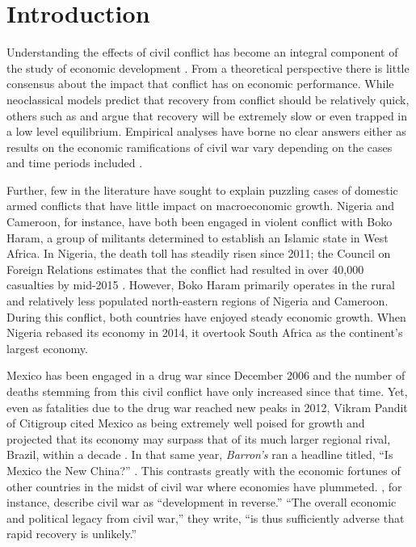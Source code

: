
\section{Introduction}
\label{intro}

Understanding the effects of civil conflict has become an integral component of the study of economic development \citep{serneels:verpoorten:2013}. From a theoretical perspective there is little consensus about the impact that conflict has on economic performance. While neoclassical models predict that recovery from conflict should be relatively quick, others such as \citet{barro:martin:2004} and \citet{sachs:2006} argue that recovery will be extremely slow or even trapped in a low level equilibrium. Empirical analyses have borne no clear answers either as results on the economic ramifications of civil war vary depending on the cases and time periods included \citep{kang:meernik:2005}. 

Further, few in the literature have sought to explain puzzling cases of domestic armed conflicts that have little impact on macroeconomic growth. Nigeria and Cameroon, for instance, have both been engaged in violent conflict with Boko Haram, a group of militants determined to establish an Islamic state in West Africa. In Nigeria, the death toll has steadily risen since 2011; the Council on Foreign Relations estimates that the conflict had resulted in over 40,000 casualties by mid-2015 \citep{CFR:2015}. However, Boko Haram primarily operates in the rural and relatively less populated north-eastern regions of Nigeria and Cameroon. During this conflict, both countries have enjoyed steady economic growth. When Nigeria rebased its economy in 2014, it overtook South Africa as the continent's largest economy.

Mexico has been engaged in a drug war since December 2006 and the number of deaths stemming from this civil conflict have only increased since that time. Yet, even as fatalities due to the drug war reached new peaks in 2012, Vikram Pandit of Citigroup cited Mexico as being extremely well poised for growth and projected that its economy may surpass that of its much larger regional rival, Brazil, within a decade \citep{vardi:2012}. In that same year, \emph{Barron's} ran a headline titled, ``Is Mexico the New China?'' \citep{kapadia:2012}. This contrasts greatly with the economic fortunes of other countries in the midst of civil war where economies have plummeted. \citet{collier:elliott:etal:2003}, for instance, describe civil war as ``development in reverse.'' ``The overall economic and political legacy from civil war,'' they write, ``is thus sufficiently adverse that rapid recovery is unlikely.''  

